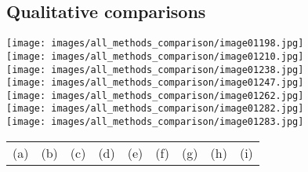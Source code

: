 \documentclass[final]{cvpr}
\newcommand{\modelname}{DECA\xspace}
\newcommand{\varhspace}{0.059}
\begin{document}
\begin{appendices}
\subsection{Qualitative comparisons}
\begin{figure*}[t]
    \offinterlineskip
    \texttt{[image: images/all\_methods\_comparison/image01198.jpg]}\\ 
    \texttt{[image: images/all\_methods\_comparison/image01210.jpg]}\\ 
    \texttt{[image: images/all\_methods\_comparison/image01238.jpg]}\\ 
    \texttt{[image: images/all\_methods\_comparison/image01247.jpg]}\\ 
    \texttt{[image: images/all\_methods\_comparison/image01262.jpg]}\\ 
    \texttt{[image: images/all\_methods\_comparison/image01282.jpg]}\\ 
    \texttt{[image: images/all\_methods\_comparison/image01283.jpg]} 
    \begin{tabular}{ccccccccc}
      \hspace{0.025\textwidth}  (a) \hspace{\varhspace\textwidth} & (b) \hspace{\varhspace\textwidth} & (c) \hspace{\varhspace\textwidth} & (d) \hspace{\varhspace\textwidth} & (e) \hspace{\varhspace\textwidth} & (f) \hspace{\varhspace\textwidth} & (g) \hspace{\varhspace\textwidth} & (h) \hspace{\varhspace\textwidth} & (i) \\
    \end{tabular}
    \caption{Comparison to previous work, from left to right: (a) Input image, (b) 3DDFA-V2~\cite{guo2020towards}, (c) FaceScape~\cite{yang2020facescape}, (d) Extreme3D~\cite{AnhTran2018}, (e) PRNet~\cite{Feng2018}, (f) Deng et al.~\cite{Deng2019}, (g) Cross-modal~\cite{Abrevaya2020}, (h) \modelname detail reconstruction, and (i) reposing (animation) of \modelname's detail reconstruction to a common expression. The expression in (i) is from the source expression E in Figure 2 of the main paper. Blank entries indicate that the particular method did not return any reconstructed mesh.}
    \label{fig:qualitative_all}
\end{figure*}


\end{appendices}
\end{document}
